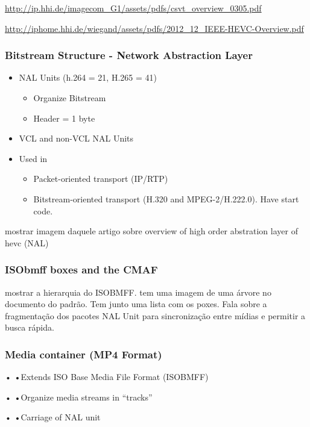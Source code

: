 \url{http://ip.hhi.de/imagecom_G1/assets/pdfs/csvt_overview_0305.pdf }

\url{http://iphome.hhi.de/wiegand/assets/pdfs/2012_12_IEEE-HEVC-Overview.pdf}

\subsubsection{Bitstream Structure - Network Abstraction Layer}

\begin{itemize}
    \item NAL Units (h.264 = 21, H.265 = 41)
    \begin{itemize}
        \item Organize Bitstream
        \item Header = 1 byte
    \end{itemize}
    \item VCL and non-VCL NAL Units
    \item Used in
    \begin{itemize}
        \item Packet-oriented transport (IP/RTP)
        \item Bitstream-oriented transport (H.320 and MPEG-2/H.222.0). Have start code.
    \end{itemize}

\end{itemize}

mostrar imagem daquele artigo sobre overview of high order abstration layer of hevc (NAL)


\subsubsection{ISObmff boxes and the CMAF}

mostrar a hierarquia do ISOBMFF. tem uma imagem de uma árvore no documento do padrão. Tem junto uma lista com os poxes. Fala sobre a fragmentação dos pacotes NAL Unit para sincronização entre mídias e permitir a busca rápida.

\subsubsection{Media container (MP4 Format)}

•	•Extends ISO Base Media File Format (ISOBMFF)

•	•Organize media streams in “tracks”

•	•Carriage of NAL unit

